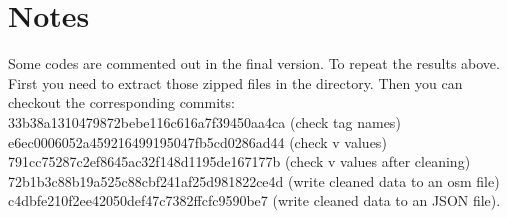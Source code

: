 \documentclass[12pt]{article}
\begin{document}
\section{Notes}
Some codes are commented out in the final version. To repeat the results above. First you need to extract those zipped files in the directory. Then you can checkout the corresponding commits:\\
33b38a1310479872bebe116c616a7f39450aa4ca (check tag names)\\
e6ec0006052a459216499195047fb5cd0286ad44 (check v values)\\
791cc75287c2ef8645ac32f148d1195de167177b (check v values after cleaning)\\
72b1b3c88b19a525c88cbf241af25d981822ce4d (write cleaned data to an osm file)\\
c4dbfe210f2ee42050def47c7382ffcfc9590be7 (write cleaned data to an JSON file).
\end{document}
